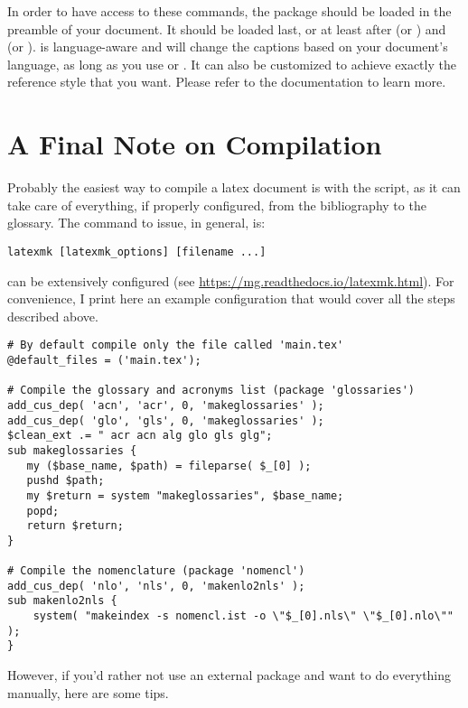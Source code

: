 In order to have access to these commands, the package 
should be loaded in the preamble of your document. It should be loaded
last, or at least after  (or ) and
 (or ). 
is language-aware and will change the captions based on your document's
language, as long as you use  or .
It can also be customized to achieve exactly the reference style that
you want. Please refer to the  documentation to learn
more.

\section{A Final Note on Compilation}
\label{compiling}

Probably the easiest way to compile a latex document is with the 
 script, as it can take care of everything, if properly 
configured, from the bibliography to the glossary. The command to issue, 
in general, is:

\begin{lstlisting}
latexmk [latexmk_options] [filename ...]
\end{lstlisting}

 can be extensively configured (see
\url{https://mg.readthedocs.io/latexmk.html}). For convenience, I print 
here an example configuration that would cover all the steps described 
above.

\begin{lstlisting}
# By default compile only the file called 'main.tex'
@default_files = ('main.tex');

# Compile the glossary and acronyms list (package 'glossaries')
add_cus_dep( 'acn', 'acr', 0, 'makeglossaries' );
add_cus_dep( 'glo', 'gls', 0, 'makeglossaries' );
$clean_ext .= " acr acn alg glo gls glg";
sub makeglossaries {
   my ($base_name, $path) = fileparse( $_[0] );
   pushd $path;
   my $return = system "makeglossaries", $base_name;
   popd;
   return $return;
}

# Compile the nomenclature (package 'nomencl')
add_cus_dep( 'nlo', 'nls', 0, 'makenlo2nls' );
sub makenlo2nls {
    system( "makeindex -s nomencl.ist -o \"$_[0].nls\" \"$_[0].nlo\"" );
}
\end{lstlisting}

However, if you'd rather not use an external package and want to do 
everything manually, here are some tips.

